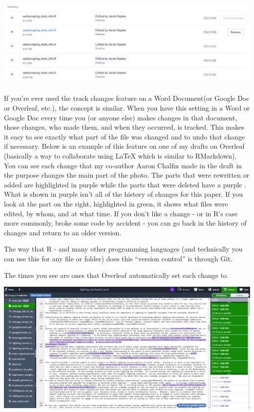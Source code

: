 \documentclass[
  12pt,
]{book}
\begin{document}
\includegraphics{images/dropbox.png}

If you're ever used the track changes feature on a Word Document(or Google Doc or Overleaf, etc.), the concept is similar. When you have this setting in a Word or Google Doc every time you (or anyone else) makes changes in that document, those changes, who made them, and when they occurred, is tracked. This makes it easy to see exactly what part of the file was changed and to undo that change if necessary. Below is an example of this feature on one of my drafts on Overleaf (basically a way to collaborate using LaTeX which is similar to RMarkdown). You can see each change that my co-author Aaron Chalfin made in the draft in the purpose changes the main part of the photo. The parts that were rewritten or added are highlighted in purple while the parts that were deleted have a purple . What is shown in purple isn't all of the history of changes for this paper. If you look at the part on the right, highlighted in green, it shows what files were edited, by whom, and at what time. If you don't like a change - or in R's case more commonly, broke some code by accident - you can go back in the history of changes and return to an older version.

The way that R - and many other programming languages (and technically you can use this for any file or folder) does this ``version control'' is through Git.

The times you see are ones that Overleaf automatically set each change to.

\includegraphics{images/overleaf.png}
\end{document}
